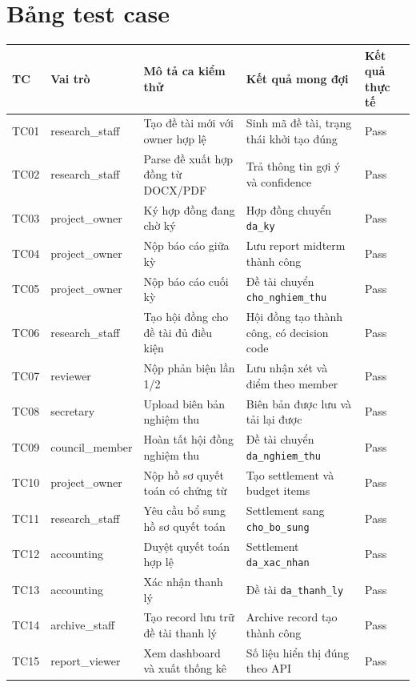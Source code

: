 \documentclass[12pt,a4paper]{report}
\begin{document}
\section{Bảng test case}
\begin{table}[H]
\centering
\scriptsize
\begin{tabular}{|L{1.3cm}|L{2.3cm}|L{3.8cm}|L{3.4cm}|L{2.7cm}|}
\hline
\textbf{TC} & \textbf{Vai trò} & \textbf{Mô tả ca kiểm thử} & \textbf{Kết quả mong đợi} & \textbf{Kết quả thực tế} \\ \hline
TC01 & research\_staff & Tạo đề tài mới với owner hợp lệ & Sinh mã đề tài, trạng thái khởi tạo đúng & Pass \\ \hline
TC02 & research\_staff & Parse đề xuất hợp đồng từ DOCX/PDF & Trả thông tin gợi ý và confidence & Pass \\ \hline
TC03 & project\_owner & Ký hợp đồng đang chờ ký & Hợp đồng chuyển \texttt{da\_ky} & Pass \\ \hline
TC04 & project\_owner & Nộp báo cáo giữa kỳ & Lưu report midterm thành công & Pass \\ \hline
TC05 & project\_owner & Nộp báo cáo cuối kỳ & Đề tài chuyển \texttt{cho\_nghiem\_thu} & Pass \\ \hline
TC06 & research\_staff & Tạo hội đồng cho đề tài đủ điều kiện & Hội đồng tạo thành công, có decision code & Pass \\ \hline
TC07 & reviewer & Nộp phản biện lần 1/2 & Lưu nhận xét và điểm theo member & Pass \\ \hline
TC08 & secretary & Upload biên bản nghiệm thu & Biên bản được lưu và tải lại được & Pass \\ \hline
TC09 & council\_member & Hoàn tất hội đồng nghiệm thu & Đề tài chuyển \texttt{da\_nghiem\_thu} & Pass \\ \hline
TC10 & project\_owner & Nộp hồ sơ quyết toán có chứng từ & Tạo settlement và budget items & Pass \\ \hline
TC11 & research\_staff & Yêu cầu bổ sung hồ sơ quyết toán & Settlement sang \texttt{cho\_bo\_sung} & Pass \\ \hline
TC12 & accounting & Duyệt quyết toán hợp lệ & Settlement \texttt{da\_xac\_nhan} & Pass \\ \hline
TC13 & accounting & Xác nhận thanh lý & Đề tài \texttt{da\_thanh\_ly} & Pass \\ \hline
TC14 & archive\_staff & Tạo record lưu trữ đề tài thanh lý & Archive record tạo thành công & Pass \\ \hline
TC15 & report\_viewer & Xem dashboard và xuất thống kê & Số liệu hiển thị đúng theo API & Pass \\ \hline

\end{tabular}
\end{table}
\end{document}
